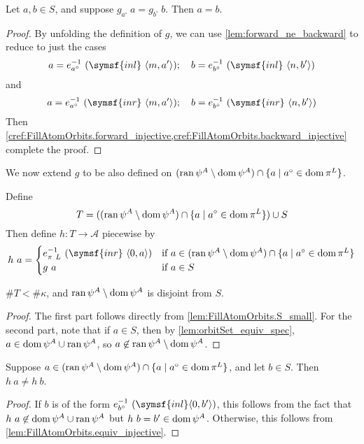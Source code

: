 \begin{lemma}
    \label{lem:FillAtomOrbits.g_injective}
    Let \( a, b \in S \), and suppose \( g_{a^\circ}\ a = g_{b^\circ}\ b \).
    Then \( a = b \).
\end{lemma}
\begin{proof}
    By unfolding the definition of \( g \), we can use \cref{lem:forward_ne_backward} to reduce to just the cases
    \[ a = e_{a^\circ}^{-1}\ (\symsf{inl}\ \langle m, a' \rangle);\quad b = e_{b^\circ}^{-1}\ (\symsf{inl}\ \langle n, b' \rangle) \]
    and
    \[ a = e_{a^\circ}^{-1}\ (\symsf{inr}\ \langle m, a' \rangle);\quad b = e_{b^\circ}^{-1}\ (\symsf{inr}\ \langle n, b' \rangle) \]
    Then \cref{cref:FillAtomOrbits.forward_injective,cref:FillAtomOrbits.backward_injective} complete the proof.
\end{proof}
We now extend \( g \) to be also defined on \( (\operatorname{ran} \psi^A \setminus \operatorname{dom} \psi^A) \cap \{ a \mid a^\circ \in \operatorname{dom} \pi^L \} \).
\begin{definition}
    Define
    \[ T = ((\operatorname{ran} \psi^A \setminus \operatorname{dom} \psi^A) \cap \{ a \mid a^\circ \in \operatorname{dom} \pi^L \}) \cup S \]
    Then define \( h : T \to \mathcal A \) piecewise by
    \[ h\ a = \begin{cases}
        e_{\pi\ L}^{-1}\ (\symsf{inr}\ \langle 0, a \rangle) & \text{if } a \in (\ran \psi^A \setminus \dom \psi^A) \cap \{ a \mid a^\circ \in \dom \pi^L \} \\
        g\ a & \text{if } a \in S
    \end{cases} \]
\end{definition}
\begin{lemma}
    \( \#T < \#\kappa \), and \( \operatorname{ran} \psi^A \setminus \operatorname{dom} \psi^A \) is disjoint from \( S \).
\end{lemma}
\begin{proof}
    The first part follows directly from \cref{lem:FillAtomOrbits.S_small}.
    For the second part, note that if \( a \in S \), then by \cref{lem:orbitSet_equiv_spec}, \( a \in \operatorname{dom} \psi^A \cup \operatorname{ran} \psi^A \), so \( a \not\in \operatorname{ran} \psi^A \setminus \operatorname{dom} \psi^A \).
\end{proof}
\begin{lemma}
    \label{lem:FillAtomOrbits.h_ne_h}
    Suppose \( a \in (\operatorname{ran} \psi^A \setminus \operatorname{dom} \psi^A) \cap \{ a \mid a^\circ \in \operatorname{dom} \pi^L \} \), and let \( b \in S \).
    Then \( h\ a \neq h\ b \).
\end{lemma}
\begin{proof}
    If \( b \) is of the form \( e_{b^\circ}^{-1}\ (\symsf{inl} \langle 0, b' \rangle) \), this follows from the fact that \( h\ a \not\in \operatorname{dom} \psi^A \cup \operatorname{ran} \psi^A \) but \( h\ b = b' \in \operatorname{dom} \psi^A \).
    Otherwise, this follows from \cref{lem:FillAtomOrbits.equiv_injective}.
\end{proof}
